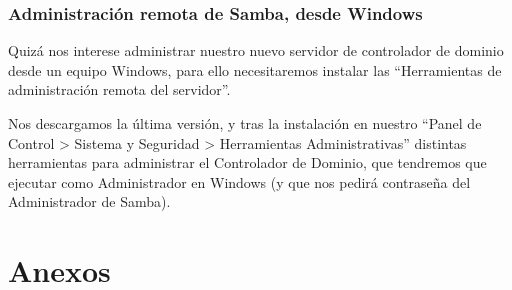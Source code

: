 \documentclass{../../../yukibook.cls/yukibook}
\begin{document}
\section{Administración remota de Samba, desde Windows}
Quizá nos interese administrar nuestro nuevo servidor de controlador de dominio desde un equipo Windows, para ello necesitaremos instalar las “Herramientas de administración remota del servidor”.

Nos descargamos la última versión, y tras la instalación en nuestro “Panel de Control > Sistema y Seguridad > Herramientas Administrativas” distintas herramientas para administrar el Controlador de Dominio, que tendremos que ejecutar como Administrador en Windows (y que nos pedirá contraseña del Administrador de Samba).



\part{Anexos}

\graphicspath{{../../../anexos/instalar_ubuntu_lts/}}


\graphicspath{{../../../anexos/ubuntu_raid1/}}


\graphicspath{{../../../anexos/monitorizacion_munin/}}


\graphicspath{{../../../anexos/}}

\end{document}
